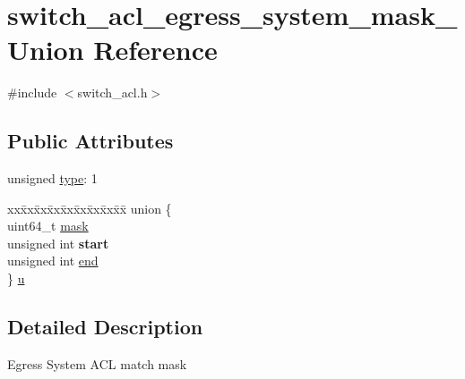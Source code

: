 \hypertarget{unionswitch__acl__egress__system__mask__}{\section{switch\+\_\+acl\+\_\+egress\+\_\+system\+\_\+mask\+\_\+ Union Reference}
\label{unionswitch__acl__egress__system__mask__}
}


{\ttfamily \#include $<$switch\+\_\+acl.\+h$>$}

\subsection*{Public Attributes}
\begin{DoxyCompactItemize}
\item 
unsigned \hyperlink{unionswitch__acl__egress__system__mask___a6446dc9bc18ec121ced34a9aaff974a0}{type}\+: 1
\item 
\begin{tabbing}
xx\=xx\=xx\=xx\=xx\=xx\=xx\=xx\=xx\=\kill
union \{\\
\>uint64\_t \hyperlink{unionswitch__acl__egress__system__mask___af6f50b3bde1f4efe78835e59de80b1ce}{mask}\\
\>unsigned int {\bfseries start}\\
\>unsigned int \hyperlink{unionswitch__acl__egress__system__mask___a9dbaa4ec39f12e0788ac16182db6217d}{end}\\
\} \hyperlink{unionswitch__acl__egress__system__mask___a697f37d371987947734860d7be3d7090}{u}\\

\end{tabbing}\end{DoxyCompactItemize}


\subsection{Detailed Description}
Egress System A\+C\+L match mask 

